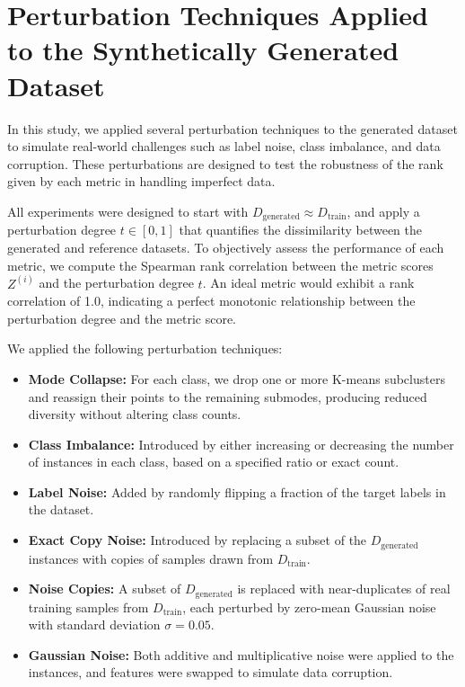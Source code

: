 \section{Perturbation Techniques Applied to the Synthetically Generated Dataset}
\label{appendix:perturbation_descriptions}
In this study, we applied several perturbation techniques to the generated dataset to simulate real-world challenges such as label noise, class imbalance, and data corruption. These perturbations are designed to test the robustness of the rank given by each metric in handling imperfect data.

All experiments were designed to start with \( D_{\text{generated}} \approx D_{\text{train}} \), and apply a perturbation degree \( t \in [0, 1] \) that quantifies the dissimilarity between the generated and reference datasets. To objectively assess the performance of each metric, we compute the Spearman rank correlation between the metric scores \( Z^{(i)} \) and the perturbation degree \( t \). An ideal metric would exhibit a rank correlation of 1.0, indicating a perfect monotonic relationship between the perturbation degree and the metric score.

We applied the following perturbation techniques:

\begin{itemize}
    \item \textbf{Mode Collapse:}  For each class, we drop one or more K-means subclusters and reassign
    their points to the remaining submodes, producing reduced diversity
    without altering class counts.
    \item \textbf{Class Imbalance:} Introduced by either increasing or decreasing the number of instances in each class, based on a specified ratio or exact count.
    \item \textbf{Label Noise:} Added by randomly flipping a fraction of the target labels in the dataset.
    \item \textbf{Exact Copy Noise:} Introduced by replacing a subset of the \( D_{\text{generated}} \) instances with copies of samples drawn from \( D_{\text{train}} \).
    \item \textbf{Noise Copies:} A subset of \( D_{\text{generated}} \) is replaced with near-duplicates of real training samples from \( D_{\text{train}} \), each perturbed by zero-mean Gaussian noise with standard deviation \( \sigma = 0.05 \).
    \item \textbf{Gaussian Noise:} Both additive and multiplicative noise were applied to the instances, and features were swapped to simulate data corruption.
\end{itemize}
